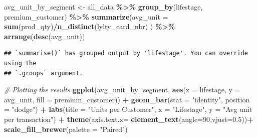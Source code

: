 \documentclass[
]{article}
\newenvironment{Shaded}{\begin{snugshade}}{\end{snugshade}}
\newcommand{\AttributeTok}[1]{\textcolor[rgb]{0.13,0.29,0.53}{#1}}
\newcommand{\CommentTok}[1]{\textcolor[rgb]{0.56,0.35,0.01}{\textit{#1}}}
\newcommand{\DecValTok}[1]{\textcolor[rgb]{0.00,0.00,0.81}{#1}}
\newcommand{\FloatTok}[1]{\textcolor[rgb]{0.00,0.00,0.81}{#1}}
\newcommand{\FunctionTok}[1]{\textcolor[rgb]{0.13,0.29,0.53}{\textbf{#1}}}
\newcommand{\NormalTok}[1]{#1}
\newcommand{\OtherTok}[1]{\textcolor[rgb]{0.56,0.35,0.01}{#1}}
\newcommand{\SpecialCharTok}[1]{\textcolor[rgb]{0.81,0.36,0.00}{\textbf{#1}}}
\newcommand{\StringTok}[1]{\textcolor[rgb]{0.31,0.60,0.02}{#1}}
\begin{document}
\begin{Shaded}
\begin{Highlighting}[]
\NormalTok{avg\_unit\_by\_segment }\OtherTok{\textless{}{-}}\NormalTok{ all\_data }\SpecialCharTok{\%\textgreater{}\%}
  \FunctionTok{group\_by}\NormalTok{(lifestage, premium\_customer) }\SpecialCharTok{\%\textgreater{}\%}
  \FunctionTok{summarize}\NormalTok{(}\AttributeTok{avg\_unit =} \FunctionTok{sum}\NormalTok{(prod\_qty)}\SpecialCharTok{/}\FunctionTok{n\_distinct}\NormalTok{(lylty\_card\_nbr) ) }\SpecialCharTok{\%\textgreater{}\%}
  \FunctionTok{arrange}\NormalTok{(}\FunctionTok{desc}\NormalTok{(avg\_unit))}
\end{Highlighting}
\end{Shaded}

\begin{verbatim}
## `summarise()` has grouped output by 'lifestage'. You can override using the
## `.groups` argument.
\end{verbatim}

\begin{Shaded}
\begin{Highlighting}[]
\CommentTok{\# Plotting the results}
\FunctionTok{ggplot}\NormalTok{(avg\_unit\_by\_segment, }\FunctionTok{aes}\NormalTok{(}\AttributeTok{x =}\NormalTok{ lifestage, }\AttributeTok{y =}\NormalTok{ avg\_unit, }\AttributeTok{fill =}\NormalTok{ premium\_customer)) }\SpecialCharTok{+}
  \FunctionTok{geom\_bar}\NormalTok{(}\AttributeTok{stat =} \StringTok{"identity"}\NormalTok{, }\AttributeTok{position =} \StringTok{"dodge"}\NormalTok{) }\SpecialCharTok{+}
  \FunctionTok{labs}\NormalTok{(}\AttributeTok{title =} \StringTok{"Units per Customer"}\NormalTok{,}
       \AttributeTok{x =} \StringTok{"Lifestage"}\NormalTok{,}
       \AttributeTok{y =} \StringTok{"Avg unit per transaction"}\NormalTok{) }\SpecialCharTok{+}
  \FunctionTok{theme}\NormalTok{(}\AttributeTok{axis.text.x=} \FunctionTok{element\_text}\NormalTok{(}\AttributeTok{angle=}\DecValTok{90}\NormalTok{,}\AttributeTok{vjust=}\FloatTok{0.5}\NormalTok{))}\SpecialCharTok{+}
  \FunctionTok{scale\_fill\_brewer}\NormalTok{(}\AttributeTok{palette =} \StringTok{"Paired"}\NormalTok{)}
\end{Highlighting}
\end{Shaded}
\end{document}
